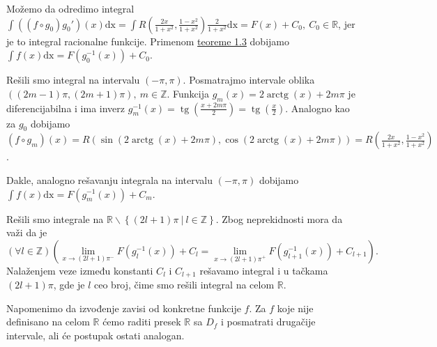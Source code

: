 \documentclass{article}
\DeclareMathOperator{\tg}{tg}
\DeclareMathOperator{\arctg}{arctg}
\begin{document}
Možemo da odredimo integral $\displaystyle\int\left(\left(f\circ g_0\right)g_0'\right)\left(x\right)\text{dx}=\int R\left(\frac{2x}{1+x^2},\frac{1-x^2}{1+x^2}\right)\frac{2}{1+x^2}\text{dx}=F\left(x\right)+C_0,\ C_0\in\mathbb{R}$,
jer je to integral racionalne funkcije. Primenom \hyperref[teorema_1.3]{teoreme 1.3} dobijamo
$\displaystyle\int f\left(x\right)\text{dx}=F\left(g_0^{-1}\left(x\right)\right)+C_0$.\par
Rešili smo integral na intervalu $\left(-\pi,\pi\right)$. Posmatrajmo intervale
oblika $\left(\left(2m-1\right)\pi,\left(2m+1\right)\pi\right),\ m\in\mathbb{Z}$. Funkcija $g_m\left(x\right)=2\arctg\left(x\right)+2m\pi$
je diferencijabilna i ima inverz $g_m^{-1}\left(x\right)=\tg\left(\frac{x+2m\pi}{2}\right)=\tg\left(\frac{x}{2}\right)$. Analogno kao za
$g_0$ dobijamo $\left(f\circ g_m\right)\left(x\right)=R\left(\sin\left(2\arctg\left(x\right)+2m\pi\right),\cos\left(2\arctg\left(x\right)+2m\pi\right)\right)=R\left(\frac{2x}{1+x^2},\frac{1-x^2}{1+x^2}\right)$.\par
Dakle, analogno rešavanju integrala na intervalu $\left(-\pi,\pi\right)$ dobijamo  $\displaystyle\int f\left(x\right)\text{dx}=F\left(g_m^{-1}\left(x\right)\right)+C_m$.\par
Rešili smo integrale na $\mathbb{R}\backslash\left\{\left(2l+1\right)\pi\ |\ l\in\mathbb{Z}\right\}$. Zbog neprekidnosti mora da važi da
je $$\left(\forall l\in\mathbb{Z}\right)\left(\lim\limits_{x\to \left(2l+1\right)\pi^{-}}F\left(g_l^{-1}\left(x\right)\right)+C_{l}=\lim\limits_{x\to \left(2l+1\right)\pi^{+}}F\left(g_{l+1}^{-1}\left(x\right)\right)+C_{l+1}\right).$$
Nalaženjem veze između konstanti $C_l$ i $C_{l+1}$ rešavamo integral i u tačkama $\left(2l+1\right)\pi$, gde je $l$ ceo broj, čime smo rešili integral
na celom $\mathbb{R}$.\par
Napomenimo da izvođenje zavisi od konkretne funkcije $f$. Za $f$ koje nije definisano na celom $\mathbb{R}$ ćemo raditi presek $\mathbb{R}$ sa $D_f$ i
posmatrati drugačije intervale, ali će postupak ostati analogan.
\end{document}
